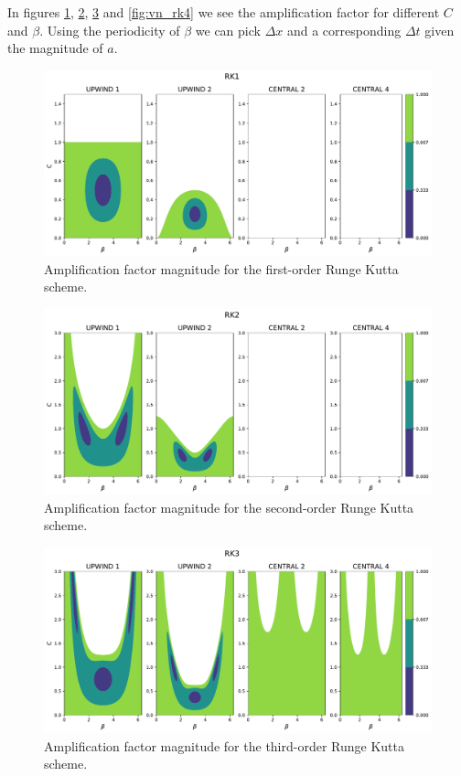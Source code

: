 In figures \ref{fig:vn_rk1}, \ref{fig:vn_rk2}, \ref{fig:vn_rk3} and \ref{fig:vn_rk4} we see the amplification factor for different $C$ and $\beta$. Using the periodicity of $\beta$ we can pick $\Delta x$ and a corresponding $\Delta t$ given the magnitude of $a$.
\begin{figure}[htbp]
    \centering
    \includegraphics[width=0.8\linewidth]{./von_neumann_figs/vn_rk1.pdf} %
    \caption{Amplification factor magnitude for the first-order Runge Kutta scheme.}
    \label{fig:vn_rk1} %
\end{figure}
\begin{figure}[htbp]
    \centering
    \includegraphics[width=0.8\linewidth]{./von_neumann_figs/vn_rk2.pdf} %
    \caption{Amplification factor magnitude for the second-order Runge Kutta scheme.}
    \label{fig:vn_rk2} %
\end{figure}
\begin{figure}[htbp]
    \centering
    \includegraphics[width=0.8\linewidth]{./von_neumann_figs/vn_rk3.pdf} %
    \caption{Amplification factor magnitude for the third-order Runge Kutta scheme.}
    \label{fig:vn_rk3} %
\end{figure}
